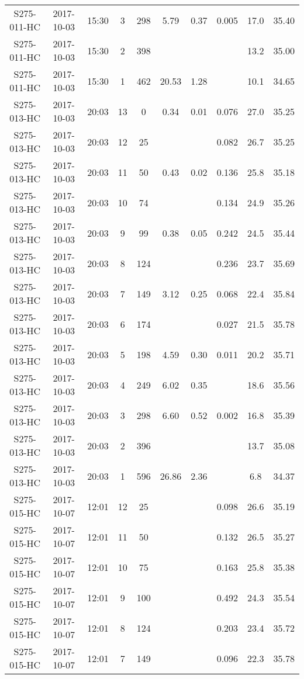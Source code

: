 \begin{longtable}{cccccccccc}
  S275-011-HC & 2017-10-03 & 15:30 & 3 & 298 & 5.79 & 0.37 & 0.005 & 17.0 & 35.40 \\ 
  S275-011-HC & 2017-10-03 & 15:30 & 2 & 398 &  &  &  & 13.2 & 35.00 \\ 
  S275-011-HC & 2017-10-03 & 15:30 & 1 & 462 & 20.53 & 1.28 &  & 10.1 & 34.65 \\ 
  S275-013-HC & 2017-10-03 & 20:03 & 13 & 0 & 0.34 & 0.01 & 0.076 & 27.0 & 35.25 \\ 
  S275-013-HC & 2017-10-03 & 20:03 & 12 & 25 &  &  & 0.082 & 26.7 & 35.25 \\ 
  S275-013-HC & 2017-10-03 & 20:03 & 11 & 50 & 0.43 & 0.02 & 0.136 & 25.8 & 35.18 \\ 
  S275-013-HC & 2017-10-03 & 20:03 & 10 & 74 &  &  & 0.134 & 24.9 & 35.26 \\ 
  S275-013-HC & 2017-10-03 & 20:03 & 9 & 99 & 0.38 & 0.05 & 0.242 & 24.5 & 35.44 \\ 
  S275-013-HC & 2017-10-03 & 20:03 & 8 & 124 &  &  & 0.236 & 23.7 & 35.69 \\ 
  S275-013-HC & 2017-10-03 & 20:03 & 7 & 149 & 3.12 & 0.25 & 0.068 & 22.4 & 35.84 \\ 
  S275-013-HC & 2017-10-03 & 20:03 & 6 & 174 &  &  & 0.027 & 21.5 & 35.78 \\ 
  S275-013-HC & 2017-10-03 & 20:03 & 5 & 198 & 4.59 & 0.30 & 0.011 & 20.2 & 35.71 \\ 
  S275-013-HC & 2017-10-03 & 20:03 & 4 & 249 & 6.02 & 0.35 &  & 18.6 & 35.56 \\ 
  S275-013-HC & 2017-10-03 & 20:03 & 3 & 298 & 6.60 & 0.52 & 0.002 & 16.8 & 35.39 \\ 
  S275-013-HC & 2017-10-03 & 20:03 & 2 & 396 &  &  &  & 13.7 & 35.08 \\ 
  S275-013-HC & 2017-10-03 & 20:03 & 1 & 596 & 26.86 & 2.36 &  & 6.8 & 34.37 \\ 
  S275-015-HC & 2017-10-07 & 12:01 & 12 & 25 &  &  & 0.098 & 26.6 & 35.19 \\ 
  S275-015-HC & 2017-10-07 & 12:01 & 11 & 50 &  &  & 0.132 & 26.5 & 35.27 \\ 
  S275-015-HC & 2017-10-07 & 12:01 & 10 & 75 &  &  & 0.163 & 25.8 & 35.38 \\ 
  S275-015-HC & 2017-10-07 & 12:01 & 9 & 100 &  &  & 0.492 & 24.3 & 35.54 \\ 
  S275-015-HC & 2017-10-07 & 12:01 & 8 & 124 &  &  & 0.203 & 23.4 & 35.72 \\ 
  S275-015-HC & 2017-10-07 & 12:01 & 7 & 149 &  &  & 0.096 & 22.3 & 35.78 \\ 

\end{longtable}

